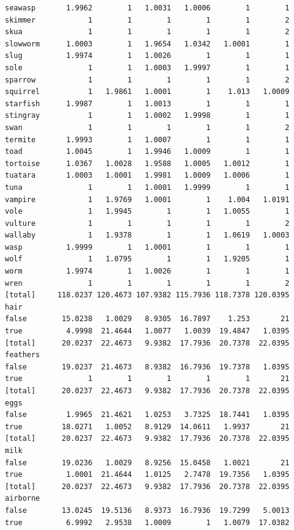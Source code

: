 \documentclass[11pt,a4paper]{article}
\begin{document}
\begin{verbatim}
seawasp       1.9962        1   1.0031   1.0006        1        1
skimmer            1        1        1        1        1        2
skua               1        1        1        1        1        2
slowworm      1.0003        1   1.9654   1.0342   1.0001        1
slug          1.9974        1   1.0026        1        1        1
sole               1        1   1.0003   1.9997        1        1
sparrow            1        1        1        1        1        2
squirrel           1   1.9861   1.0001        1    1.013   1.0009
starfish      1.9987        1   1.0013        1        1        1
stingray           1        1   1.0002   1.9998        1        1
swan               1        1        1        1        1        2
termite       1.9993        1   1.0007        1        1        1
toad          1.0045        1   1.9946   1.0009        1        1
tortoise      1.0367   1.0028   1.9588   1.0005   1.0012        1
tuatara       1.0003   1.0001   1.9981   1.0009   1.0006        1
tuna               1        1   1.0001   1.9999        1        1
vampire            1   1.9769   1.0001        1    1.004   1.0191
vole               1   1.9945        1        1   1.0055        1
vulture            1        1        1        1        1        2
wallaby            1   1.9378        1        1   1.0619   1.0003
wasp          1.9999        1   1.0001        1        1        1
wolf               1   1.0795        1        1   1.9205        1
worm          1.9974        1   1.0026        1        1        1
wren               1        1        1        1        1        2
[total]     118.0237 120.4673 107.9382 115.7936 118.7378 120.0395
hair
false        15.0238   1.0029   8.9305  16.7897    1.253       21
true          4.9998  21.4644   1.0077   1.0039  19.4847   1.0395
[total]      20.0237  22.4673   9.9382  17.7936  20.7378  22.0395
feathers
false        19.0237  21.4673   8.9382  16.7936  19.7378   1.0395
true               1        1        1        1        1       21
[total]      20.0237  22.4673   9.9382  17.7936  20.7378  22.0395
eggs
false         1.9965  21.4621   1.0253   3.7325  18.7441   1.0395
true         18.0271   1.0052   8.9129  14.0611   1.9937       21
[total]      20.0237  22.4673   9.9382  17.7936  20.7378  22.0395
milk
false        19.0236   1.0029   8.9256  15.0458   1.0021       21
true          1.0001  21.4644   1.0125   2.7478  19.7356   1.0395
[total]      20.0237  22.4673   9.9382  17.7936  20.7378  22.0395
airborne
false        13.0245  19.5136   8.9373  16.7936  19.7299   5.0013
true          6.9992   2.9538   1.0009        1   1.0079  17.0382

\end{verbatim}
\end{document}
